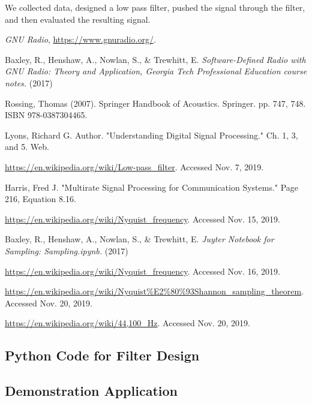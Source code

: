 We collected data, designed a low pass filter, pushed the signal
through the filter, and then evaluated the resulting signal.







\begin{thebibliography}{1}

\emph{GNU Radio}, \url{https://www.gnuradio.org/}.

 Baxley, R., Henshaw, A., Nowlan, S., \&
Trewhitt, E. \emph{Software-Defined Radio with GNU Radio: Theory
and Application, Georgia Tech Professional Education course
notes.} (2017)

 Rossing, Thomas (2007). Springer Handbook of
Acoustics. Springer. pp. 747, 748. ISBN 978-0387304465.

 Lyons, Richard G. Author. "Understanding
Digital Signal Processing." Ch. 1, 3, and 5. Web.

\url{https://en.wikipedia.org/wiki/Low-pass_filter}. Accessed
Nov. 7, 2019.

 Harris, Fred J. "Multirate Signal Processing
for Communication Systems." Page 216, Equation 8.16.

\url{https://en.wikipedia.org/wiki/Nyquist_frequency}. Accessed
Nov. 15, 2019.

 Baxley, R., Henshaw, A., Nowlan, S.,
\& Trewhitt, E. \emph{Juyter Notebook for Sampling:
Sampling.ipynb.} (2017)

\url{https://en.wikipedia.org/wiki/Nyquist_frequency}. Accessed
Nov. 16, 2019.

\url{https://en.wikipedia.org/wiki/Nyquist\%E2\%80\%93Shannon_sampling_theorem}.
Accessed Nov. 20, 2019.

 \url{https://en.wikipedia.org/wiki/44,100_Hz}.
Accessed Nov. 20, 2019.

\end{thebibliography}

\newpage

\onecolumn
\appendix 

\subsection{Python Code for Filter Design\cite{notes:class}}


\subsection{Demonstration Application\cite{notes:app}}





